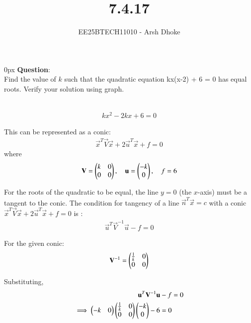 \documentclass[journal]{IEEEtran}
\begin{document}

\vspace{3cm}

\title{7.4.17}
\author{EE25BTECH11010 - Arsh Dhoke}
{\let\newpage\relax\maketitle}

\renewcommand{\thefigure}{\theenumi}
\renewcommand{\thetable}{\theenumi}
\setlength{\intextsep}{10pt}
\renewcommand{\thetable}{\theenumi}

\parindent 0px
\textbf{Question}:\\
Find the value of $k$ such that the quadratic equation
kx(x-2) + 6 = 0 has equal roots. Verify your solution using graph.

\solution \\


\begin{align}
kx^2 - 2kx + 6 = 0
\end{align}

This can be represented as a conic:
\begin{align}
\vec{x}^{T}\vec{V}\vec{x} + 2\vec{u}^{T}\vec{x} + f = 0
\end{align}
where
\begin{align}
\mathbf{V} = \begin{pmatrix}k & 0 \\ 0 & 0\end{pmatrix}, \quad
\mathbf{u} = \begin{pmatrix}-k \\ 0\end{pmatrix}, \quad
f = 6
\end{align}

For the roots of the quadratic to be equal, the line $y=0$ (the $x$-axis)
must be a tangent to the conic.
The condition for tangency of a line $\vec{n}^{T}\vec{x} = c$
with a conic $\vec{x}^{T}\vec{V}\vec{x} + 2\vec{u}^{T}\vec{x} + f = 0$
is :
\begin{align}
\vec{u}^{T}\vec{V}^{-1}\vec{u} - f = 0
\end{align}

For the given conic:
\begin{align}
\mathbf{V}^{-1} = \begin{pmatrix}\frac{1}{k} & 0 \\ 0 & 0\end{pmatrix}
\end{align}

Substituting,
\begin{align}
\mathbf{u}^{T}\mathbf{V}^{-1}\mathbf{u} - f &= 0 \\
\implies
\begin{pmatrix}-k & 0\end{pmatrix}
\begin{pmatrix}\frac{1}{k} & 0 \\ 0 & 0\end{pmatrix}
\begin{pmatrix}-k \\ 0\end{pmatrix} - 6 = 0 
\end{align}
\end{document}
